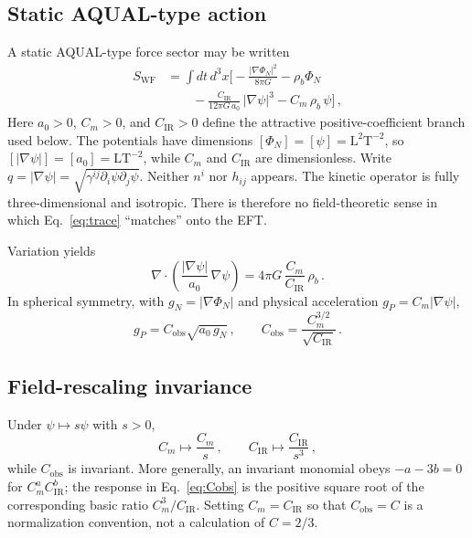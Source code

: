 \documentclass[aps,prd,reprint,superscriptaddress,nofootinbib,floatfix,showkeys]{revtex4-2}
\newcommand{\Cobs}{C_{\mathrm{obs}}}
\newcommand{\Cm}{C_{m}}
\newcommand{\CIR}{C_{\mathrm{IR}}}
\newcommand{\azero}{a_{0}}
\begin{document}
\subsection{Static AQUAL-type action}

A static AQUAL-type force sector \cite{bekenstein_milgrom} may be written
\begin{align}
  S_{\mathrm{WF}}
  &= \int\! dt\,d^{3}x
  \Biggl[
  -\frac{|\nabla\Phi_{N}|^{2}}{8\pi G}
  - \rho_{b}\Phi_{N}
  \nonumber\\
  &\qquad
  - \frac{\CIR}{12\pi G\,\azero}\,|\nabla\psi|^{3}
  - \Cm\,\rho_{b}\,\psi
  \Biggr]\,,
  \label{eq:SWF}
\end{align}
Here \(\azero>0\), \(\Cm>0\), and \(\CIR>0\) define the attractive
positive-coefficient branch used below. The potentials have dimensions
\([\Phi_N]=[\psi]=\mathrm{L}^2\mathrm{T}^{-2}\), so
\([|\nabla\psi|]=[\azero]=\mathrm{L}\mathrm{T}^{-2}\), while \(\Cm\)
and \(\CIR\) are dimensionless. Write
\(q=|\nabla\psi|=\sqrt{\gamma^{ij}\partial_{i}\psi\partial_{j}\psi}\).
Neither \(n^{i}\) nor \(h_{ij}\) appears.  The kinetic operator is fully
three-dimensional and isotropic.  There is therefore no field-theoretic sense
in which Eq.~\eqref{eq:trace} ``matches'' onto the EFT.

Variation yields
\begin{equation}
  \nabla\cdot\!\left(\frac{|\nabla\psi|}{\azero}\,\nabla\psi\right)
  = 4\pi G\,\frac{\Cm}{\CIR}\,\rho_{b}\,.
  \label{eq:p3}
\end{equation}
In spherical symmetry, with \(g_{N}=|\nabla\Phi_{N}|\) and physical
acceleration \(g_{P}=\Cm|\nabla\psi|\),
\begin{equation}
  g_{P} = \Cobs\sqrt{\azero\,g_{N}}\,,
  \qquad
  \boxed{
  \Cobs = \frac{\Cm^{3/2}}{\sqrt{\CIR}}
  }\,.
  \label{eq:Cobs}
\end{equation}

\subsection{Field-rescaling invariance}

Under \(\psi\mapsto s\psi\) with \(s>0\),
\begin{equation}
  \Cm\mapsto\frac{\Cm}{s}\,,
  \qquad
  \CIR\mapsto\frac{\CIR}{s^{3}}\,,
  \label{eq:rescale}
\end{equation}
while \(\Cobs\) is invariant.  More generally, an invariant monomial obeys
\(-a-3b=0\) for \(\Cm^a\CIR^b\); the response in
Eq.~\eqref{eq:Cobs} is the positive square root of the corresponding basic
ratio \(\Cm^3/\CIR\).  Setting \(\Cm=\CIR\) so that \(\Cobs=C\) is a
normalization convention, not a calculation of \(C=2/3\).
\end{document}

